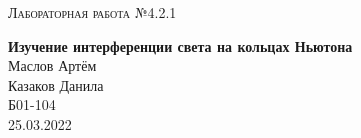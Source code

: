 \documentclass[12pt,a4paper]{extreport}
\begin{document}
	
	\begin{center}
		\large
		\textsc{Лабораторная работа №4.2.1}
		
		\LARGE
		\textbf{Изучение интерференции света на кольцах Ньютона}
		\\[5mm]

		\large
		Маслов Артём \\
		Казаков Данила \\
		Б01-104
		\\[3mm]
		25.03.2022
	\end{center}
			
	
	
	

	

	
	
	
	
	
	
\end{document}
